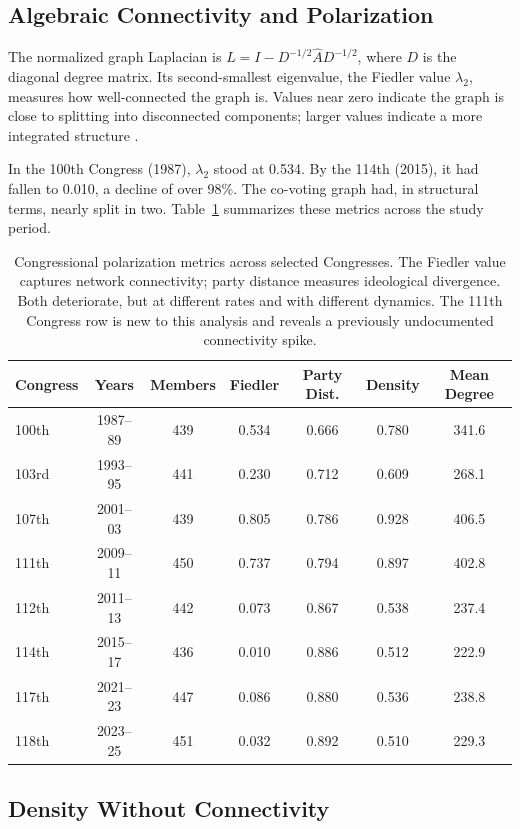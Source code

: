 \documentclass[12pt, a4paper]{article}
\begin{document}
\subsection{Algebraic Connectivity and Polarization}

The normalized graph Laplacian is $L = I - D^{-1/2} \hat{A} D^{-1/2}$, where $D$ is the diagonal degree matrix. Its second-smallest eigenvalue, the Fiedler value $\lambda_2$, measures how well-connected the graph is. Values near zero indicate the graph is close to splitting into disconnected components; larger values indicate a more integrated structure \citep{fiedler1973}.

In the 100th Congress (1987), $\lambda_2$ stood at 0.534. By the 114th (2015), it had fallen to 0.010, a decline of over 98\%. The co-voting graph had, in structural terms, nearly split in two. Table~\ref{tab:polarization} summarizes these metrics across the study period.

\begin{table}[H]
\centering
\caption{Congressional polarization metrics across selected Congresses. The Fiedler value captures network connectivity; party distance measures ideological divergence. Both deteriorate, but at different rates and with different dynamics. The 111th Congress row is new to this analysis and reveals a previously undocumented connectivity spike.}
\label{tab:polarization}
\begin{tabular}{lcccccc}
\toprule
Congress & Years & Members & Fiedler & Party Dist. & Density & Mean Degree \\
\midrule
100th & 1987--89 & 439 & 0.534 & 0.666 & 0.780 & 341.6 \\
103rd & 1993--95 & 441 & 0.230 & 0.712 & 0.609 & 268.1 \\
107th & 2001--03 & 439 & 0.805 & 0.786 & 0.928 & 406.5 \\
111th & 2009--11 & 450 & 0.737 & 0.794 & 0.897 & 402.8 \\
112th & 2011--13 & 442 & 0.073 & 0.867 & 0.538 & 237.4 \\
114th & 2015--17 & 436 & 0.010 & 0.886 & 0.512 & 222.9 \\
117th & 2021--23 & 447 & 0.086 & 0.880 & 0.536 & 238.8 \\
118th & 2023--25 & 451 & 0.032 & 0.892 & 0.510 & 229.3 \\
\bottomrule
\end{tabular}
\end{table}

\subsection{Density Without Connectivity}
\end{document}
